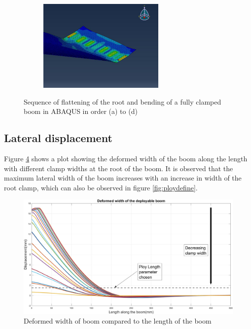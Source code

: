 \begin{figure}[!hbt]
\begin{subfigure}{.5\linewidth}
\caption{}
\label{fig:sub3}
\end{subfigure}
\label{fig:test}
\begin{subfigure}{.5\linewidth}
\centering
\includegraphics[height=4.5cm]{images/6.JPG}
\caption{}
\label{fig:case24}
\end{subfigure}
\caption{Sequence of flattening of the root and bending of a fully clamped boom in ABAQUS in order (a) to (d)}
\label{fig:sequence}
\end{figure}

\subsection{Lateral displacement}

Figure \ref{fig:ploy1} shows a plot showing the deformed width of the boom along the length with different clamp widths at the root of the boom. It is observed that the maximum lateral width of the boom increases with an increase in width of the root clamp, which can also be observed in figure \ref{fig:ploydefine}. 

\begin{figure}[!hbt]
    \centering
    \includegraphics[width=15cm]{images/maxwidth.jpg}
    \caption{Deformed width of boom compared to the length of the boom}
    \label{fig:ploy1}
\end{figure}

